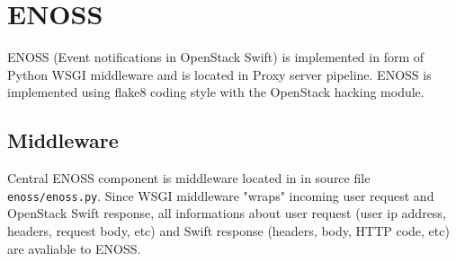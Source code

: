 \section{ENOSS}
    ENOSS (Event notifications in OpenStack Swift) is implemented in form of Python WSGI middleware and is located in Proxy server pipeline. ENOSS is implemented using flake8 coding style with the OpenStack hacking module.

    \subsection{Middleware}\label{sec:enoss-swift-section}
    Central ENOSS component is middleware located in in source file \texttt{enoss/enoss.py}. Since WSGI middleware "wraps" incoming user request and OpenStack Swift response, all informations about user request (user ip address, headers, request body, etc) and Swift response (headers, body, HTTP code, etc) are avaliable to ENOSS.

